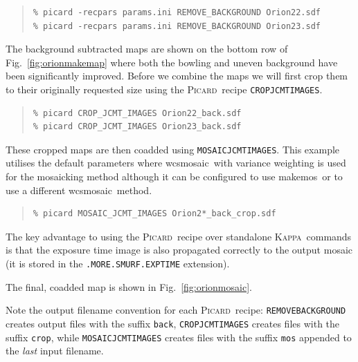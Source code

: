 \documentclass[twoside,11pt]{article}
\newcommand{\xref}[3]{#1}
\renewcommand{\_}{\texttt{\symbol{95}}}
\newenvironment{myquote}{\begin{quote}\begin{small}}{\end{small}\end{quote}}
\newcommand{\Kappa}{\xref{\textsc{Kappa}}{sun95}{}}
\newcommand{\picard}{\xref{\textsc{Picard}}{sun231}{}}
\newcommand{\drrecipe}[1]{\texttt{#1}}
\newcommand{\task}[1]{\textsf{#1}}
\newcommand{\wcsmosaic}{\xref{\task{wcsmosaic}}{sun95}{WCSMOSAIC}}
\newcommand{\makemos}{\xref{\task{makemos}}{sun139}{MAKEMOS}}
\begin{document}
\begin{myquote}
\begin{verbatim}
% picard -recpars params.ini REMOVE_BACKGROUND Orion22.sdf
% picard -recpars params.ini REMOVE_BACKGROUND Orion23.sdf
\end{verbatim}
\end{myquote}

The background subtracted maps are shown on the bottom row of
Fig.~\ref{fig:orionmakemap} where both the bowling and uneven
background have been significantly improved. Before we combine the
maps we will first crop them to their originally requested size using
the \picard\ recipe \drrecipe{CROP\_JCMT\_IMAGES}.
\begin{myquote}
\begin{verbatim}
% picard CROP_JCMT_IMAGES Orion22_back.sdf
% picard CROP_JCMT_IMAGES Orion23_back.sdf
\end{verbatim}
\end{myquote}

These cropped maps are then coadded using \drrecipe{MOSAIC\_JCMT\_IMAGES}. This
example utilises the default parameters where \wcsmosaic\ with variance
weighting is used for the mosaicking method although it can be
configured to use \makemos\ or to use a different \wcsmosaic\ method.
\begin{myquote}
\begin{verbatim}
% picard MOSAIC_JCMT_IMAGES Orion2*_back_crop.sdf
\end{verbatim}
\end{myquote}

The key advantage to using the \picard\ recipe over standalone
\Kappa\ commands is that the exposure time image is also propagated
correctly to the output mosaic (it is stored in the
\texttt{.MORE.SMURF.EXP\_TIME} extension).

The final, coadded map is shown in Fig.~\ref{fig:orionmosaic}.

Note the output filename convention for each \picard\ recipe:
\drrecipe{REMOVE\_BACKGROUND} creates output files with the suffix
\texttt{\_back}, \drrecipe{CROP\_JCMT\_IMAGES} creates files with the
suffix \texttt{\_crop}, while \drrecipe{MOSAIC\_JCMT\_IMAGES} creates
files with the suffix \texttt{\_mos} appended to the \textit{last} input
filename.
\end{document}
